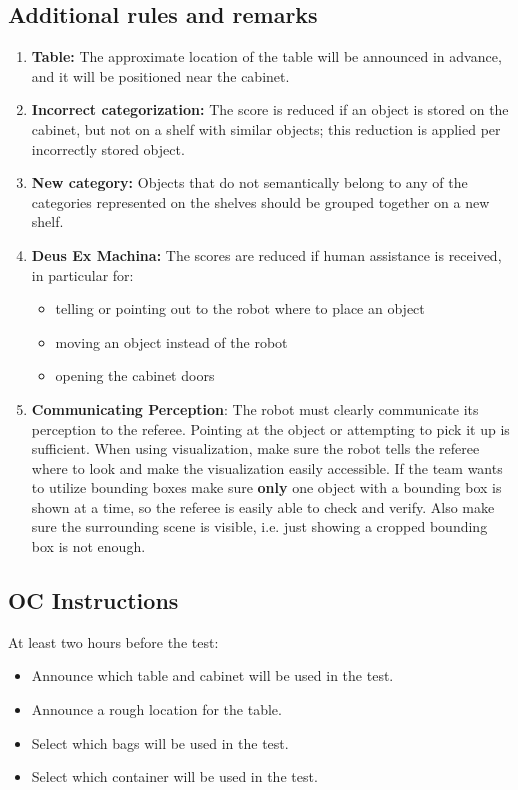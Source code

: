 \subsection*{Additional rules and remarks}
\begin{enumerate}
	\item \textbf{Table:} The approximate location of the table will be announced in advance, and it will be positioned near the cabinet.
	\item \textbf{Incorrect categorization:} The score is reduced if an object is stored on the cabinet, but not on a shelf with similar objects; this reduction is applied per incorrectly stored object.
	\item \textbf{New category:} Objects that do not semantically belong to any of the categories represented on the shelves should be grouped together on a new shelf.
	\item \textbf{Deus Ex Machina:} The scores are reduced if human assistance is received, in particular for:
	\begin{itemize}
		\item telling or pointing out to the robot where to place an object
		\item moving an object instead of the robot
		\item opening the cabinet doors
	\end{itemize}
	\item \textbf{Communicating Perception}: The robot must clearly communicate its perception to the referee.
	Pointing at the object or attempting to pick it up is sufficient.
	When using visualization, make sure the robot tells the referee where to look and make the visualization easily accessible. 
	If the team wants to utilize bounding boxes make sure \textbf{only} one object with a bounding box is shown at a time, so the referee is easily able to check and verify.
	Also make sure the surrounding scene is visible, i.e. just showing a cropped bounding box is not enough.
\end{enumerate}

\subsection*{OC Instructions}

At least two hours before the test:
\begin{itemize}
	\item Announce which table and cabinet will be used in the test.
	\item Announce a rough location for the table.
	\item Select which bags will be used in the test.
	\item Select which container will be used in the test.
\end{itemize}

